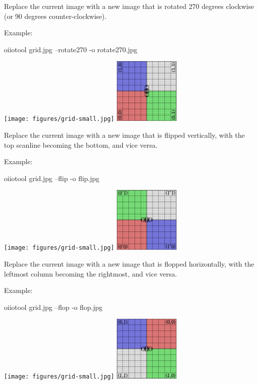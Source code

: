 Replace the current image with a new image that is rotated 270 degrees
clockwise (or 90 degrees counter-clockwise).

\noindent Example:
\begin{code}
    oiiotool grid.jpg --rotate270 -o rotate270.jpg
\end{code}
\spc \texttt{[image: figures/grid-small.jpg]}
\raisebox{40pt}{\large $\rightarrow$}
\includegraphics[width=1.25in]{figures/rotate270.jpg} \\
\apiend

Replace the current image with a new image that is flipped vertically,
with the top scanline becoming the bottom, and vice versa.

\noindent Example:
\begin{code}
    oiiotool grid.jpg --flip -o flip.jpg
\end{code}
\spc \texttt{[image: figures/grid-small.jpg]} 
\raisebox{40pt}{\large $\rightarrow$}
\includegraphics[width=1.25in]{figures/flip.jpg} \\
\apiend

Replace the current image with a new image that is flopped horizontally,
with the leftmost column becoming the rightmost, and vice versa.

\noindent Example:
\begin{code}
    oiiotool grid.jpg --flop -o flop.jpg
\end{code}
\spc \texttt{[image: figures/grid-small.jpg]} 
\raisebox{40pt}{\large $\rightarrow$}
\includegraphics[width=1.25in]{figures/flop.jpg} \\
\apiend

